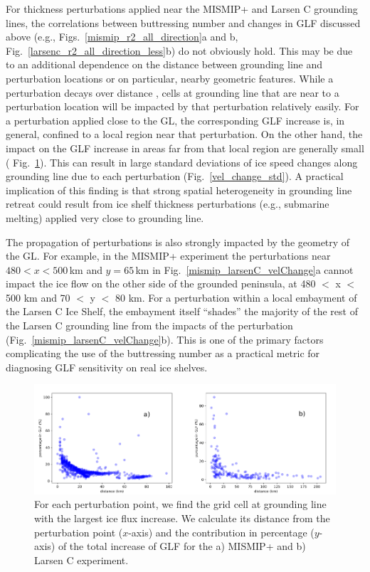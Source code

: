 \documentclass[tc, manuscript]{copernicus}
\begin{document}
For thickness perturbations applied near the MISMIP+ and Larsen C grounding lines, the correlations between buttressing number and changes in GLF discussed above (e.g., Figs.~\ref{mismip_r2_all_direction}a and b, Fig.~\ref{larsenc_r2_all_direction_less}b) do not obviously hold. This may be due to an additional dependence on the distance between grounding line and perturbation locations or on particular, nearby geometric features. While a perturbation decays over distance \citep{lick1970}, cells at grounding line  that are near to a perturbation location will be impacted by that perturbation relatively easily. For a perturbation applied close to the GL, the corresponding GLF increase is, in general, confined to a local region near that perturbation. On the other hand, the impact on the GLF increase in areas far from that local region are generally small ( Fig.~\ref{mismip_larsenc_distance_vel_change}). This can result in large standard deviations of ice speed changes along grounding line due to each perturbation (Fig.~\ref{vel_change_std}). A practical implication of this finding is that strong spatial heterogeneity in grounding line retreat could result from ice shelf thickness perturbations (e.g., submarine melting) applied very close to grounding line. 

The propagation of perturbations is also strongly impacted by the geometry of the GL. For example, in the MISMIP+ experiment the perturbations near $480 < x < 500$\,km and $y = 65$\,km in Fig.~\ref{mismip_larsenC_velChange}a cannot impact the ice flow on the other side of the grounded peninsula, at 480 $<$ x $<$ 500 km and 70 $<$ y $<$ 80 km. For a perturbation within a local embayment of the Larsen C Ice Shelf, the embayment itself ``shades'' the majority of the rest of the Larsen C grounding line from the impacts of the perturbation (Fig.~\ref{mismip_larsenC_velChange}b). This is one of the primary factors complicating the use of the buttressing number as a practical metric for diagnosing GLF sensitivity on real ice shelves.

\begin{figure}
	\centering
	\includegraphics[width=1\linewidth]{./figs/mismip_larsenc_distance_velchange.pdf}
	\caption{For each perturbation point, we find the grid cell at grounding line with the largest ice flux increase. We calculate its distance from the perturbation point ($x$-axis) and the contribution in percentage ($y$-axis) of the total increase of GLF for the a) MISMIP+ and b) Larsen C experiment.}
	\label{mismip_larsenc_distance_vel_change}
\end{figure}
 
\end{document}
